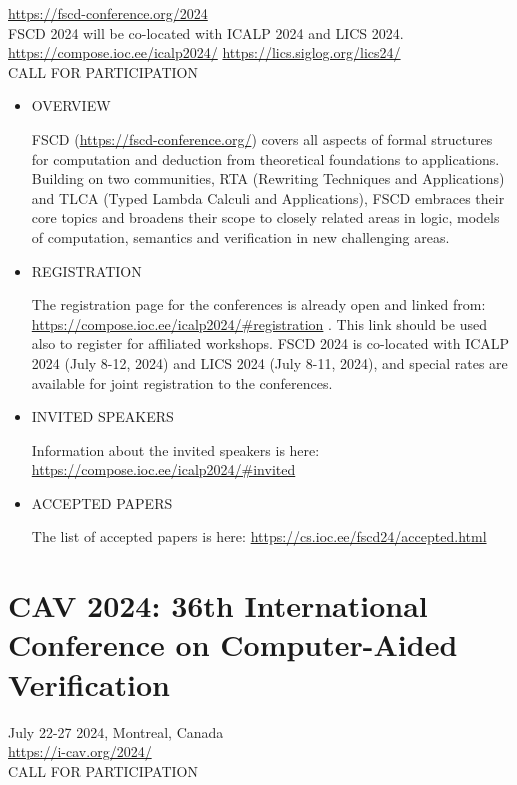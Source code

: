 \documentclass[prodmode,acmtecs]{acmsmall} %
\begin{document}
  \href{https://fscd-conference.org/2024}{https://fscd-conference.org/2024}\\ 
  FSCD 2024 will be co-located with ICALP 2024 and LICS 2024. \href{https://compose.ioc.ee/icalp2024/}{https://compose.ioc.ee/icalp2024/} \href{https://lics.siglog.org/lics24/}{https://lics.siglog.org/lics24/}\\ 
CALL FOR PARTICIPATION 

\begin{itemize}\item  OVERVIEW 
 
  FSCD (\href{https://fscd-conference.org/}{https://fscd-conference.org/}) covers all aspects of formal structures for computation and deduction from theoretical foundations to applications. Building on two communities, RTA (Rewriting Techniques and Applications) and TLCA (Typed Lambda Calculi and Applications), FSCD embraces their core topics and broadens their scope to closely related areas in logic, models of computation, semantics and verification in new challenging areas.  
 
\item  REGISTRATION  
 
  The registration page for the conferences is already open and linked from: \href{https://compose.ioc.ee/icalp2024/#registration}{https://compose.ioc.ee/icalp2024/\#registration} . This link should be used also to register for affiliated workshops. FSCD 2024 is co-located with ICALP 2024 (July 8-12, 2024) and LICS 2024 (July 8-11, 2024), and special rates are available for joint registration to the conferences. 
 
\item  INVITED SPEAKERS 
 
  Information about the invited speakers is here: \href{https://compose.ioc.ee/icalp2024/#invited}{https://compose.ioc.ee/icalp2024/\#invited} 
 
\item  ACCEPTED PAPERS 
 
  The list of accepted papers is here: \href{https://cs.ioc.ee/fscd24/accepted.html}{https://cs.ioc.ee/fscd24/accepted.html} 
 
\end{itemize}\section{CAV 2024: 36th International Conference on Computer-Aided Verification }\label{CAV2024}  July 22-27 2024, Montreal, Canada\\ 
  \href{https://i-cav.org/2024/}{https://i-cav.org/2024/}\\ 
CALL FOR PARTICIPATION 
\end{document}
